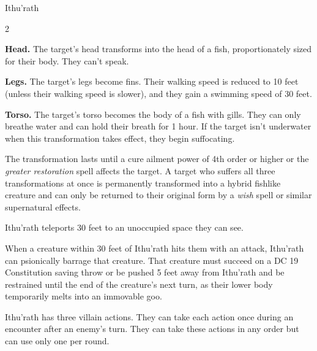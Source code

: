 \documentclass[10pt,a4paper,twoside,bg=print,twocolumn,openany,nodeprecatedcode]{dndbook}
\begin{document}
\begin{DndMonster}[float*=b,width=\textwidth + 8pt]{Ithu'rath}
\begin{multicols}{2}
\begin{description}
\item \textbf{Head.} The target's head transforms into the head of a fish, proportionately sized for their body. They can't speak.
\item \textbf{Legs.} The target's legs become fins. Their walking speed is reduced to 10 feet (unless their walking speed is slower), and they gain a swimming speed of 30 feet.
\item \textbf{Torso.} The target's torso becomes the body of a fish with gills. They can only breathe water and can hold their breath for 1 hour. If the target isn't underwater when this transformation takes effect, they begin suffocating.
\end{description}

The transformation lasts until a cure ailment power of 4th order or higher or the \textit{greater restoration} spell affects the target. A target who suffers all three transformations at once is permanently transformed into a hybrid fishlike creature and can only be returned to their original form by a \textit{wish} spell or similar supernatural effects.

Ithu'rath teleports 30 feet to an unoccupied space they can see.

When a creature within 30 feet of Ithu'rath hits them with an attack, Ithu'rath can psionically barrage that creature. That creature must succeed on a DC 19 Constitution saving throw or be pushed 5 feet away from Ithu'rath and be restrained until the end of the creature's next turn, as their lower body temporarily melts into an immovable goo.

Ithu'rath has three villain actions. They can take each action once during an encounter after an enemy's turn. They can take these actions in any order but can use only one per round.


\end{multicols}
\end{DndMonster}
\end{document}
